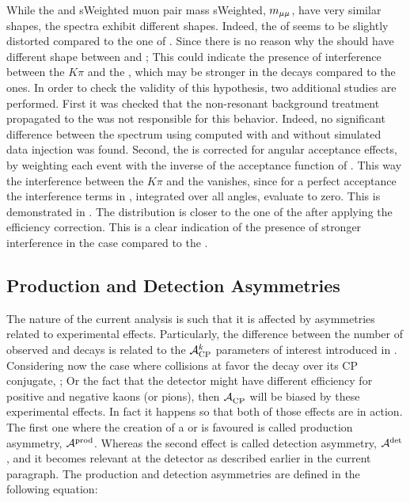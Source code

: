 While the \Bs and \Bd sWeighted muon pair mass sWeighted, $m_{\mu\mu}$, have very similar shapes, the \mkpi spectra exhibit different shapes.
Indeed, the \Bs \mkpi \sPlot of  seems to be slightly distorted compared to the one of \Bd \mkpi.
Since there is no \aprior reason why the \Kst \pwave
should have different shape between \BsJpsiKst and \BdJpsiKst; This could indicate the presence of interference between
the $K\pi$ \swave and the \Kstarz, which may be stronger in the \Bs decays compared to the \Bd ones. In order
to check the validity of this hypothesis, two additional studies are performed. First it was checked that the non-resonant
background treatment propagated to the \sWeights was not responsible for this behavior. Indeed, no significant difference
between the \Bs \mkpi spectrum using \sWeights computed with and without simulated data injection was found. Second, the \mkpi
is corrected for angular acceptance effects, by weighting each event with the inverse of the acceptance function of .
This way the interference between the $K\pi$ \swave and the \Kstarz \pwave vanishes, since
for a perfect acceptance the interference terms in , integrated over all angles, evaluate to zero.
This is demonstrated in . The \Bs \mkpi distribution is closer to the one of the \Bd after applying
the efficiency correction. This is a clear indication of the presence of stronger interference in the \Bs case compared to the \Bd.

\subsection{Production and Detection Asymmetries}
\label{experimentalAssym}
The nature of the current analysis is such that it is affected by asymmetries related to experimental effects.
Particularly, the difference between the number of observed \BsJpsiKst and \BsbarJpsiKst decays is related to
the $\mathcal{A}_{\rm CP}^{k}$ parameters of interest introduced in .
Considering now the case where collisions at \lhc favor the \BsJpsiKst decay over its CP conjugate, \BsbarJpsiKst;
Or the fact that the detector might have different efficiency for positive and negative kaons (or pions),
then $\mathcal{A}_{\rm CP}^{}$ will be biased by these experimental effects. In fact it happens so that both of those effects are in action.
The first one where the creation of a \Bs or \Bsb is favoured is called production asymmetry, $\mathcal{A}^{\text{prod}}$.
Whereas the second effect is called detection asymmetry, $\mathcal{A}^{\text{det}}$, and it becomes relevant
at the \lhcb detector as described earlier in the current paragraph. The production and detection
asymmetries are defined in the following equation:

